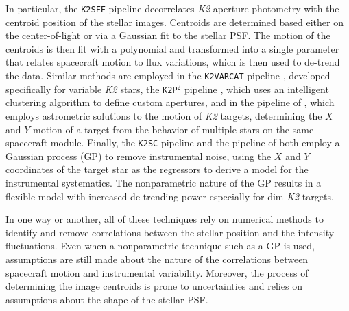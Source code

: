 \documentclass[]{emulateapj}
\begin{document}
In particular, the \texttt{K2SFF} pipeline \citep{VJ14} decorrelates \emph{K2} aperture 
photometry with the centroid position
of the stellar images. Centroids are determined based either on the center-of-light
or via a Gaussian fit to the stellar PSF. The motion of the centroids is then fit with a polynomial
and transformed into a single parameter that relates spacecraft motion to flux variations,
which is then used to de-trend the data. Similar methods are employed in the \texttt{K2VARCAT} pipeline \citep{ARM15}, 
developed specifically for variable \emph{K2} stars, the \texttt{K2P$^2$} pipeline \citep{LUN15},
which uses an intelligent clustering algorithm to define custom apertures, and in the pipeline
of \cite{HUA15}, which employs astrometric solutions to the motion of \emph{K2} targets,
determining the $X$ and $Y$ motion of a target from the behavior of multiple stars on
the same spacecraft module. Finally, the \texttt{K2SC} pipeline \citep{AIG15,AIG16} and 
the pipeline of \cite{CRO15} both employ a Gaussian process (GP) to remove
instrumental noise, using the $X$ and $Y$ coordinates of the target star as the regressors to derive
a model for the instrumental systematics. The nonparametric nature of the GP results 
in a flexible model with increased de-trending power especially for dim \emph{K2}
targets.

In one way or another, all of these techniques rely on numerical methods to identify and 
remove correlations between the stellar position and the intensity fluctuations. Even
when a nonparametric technique such as a GP is used, assumptions are still made about
the nature of the correlations between spacecraft motion and instrumental variability.
Moreover, the process of determining the image centroids is prone to uncertainties
and relies on assumptions about the shape of the stellar PSF.
\end{document}
